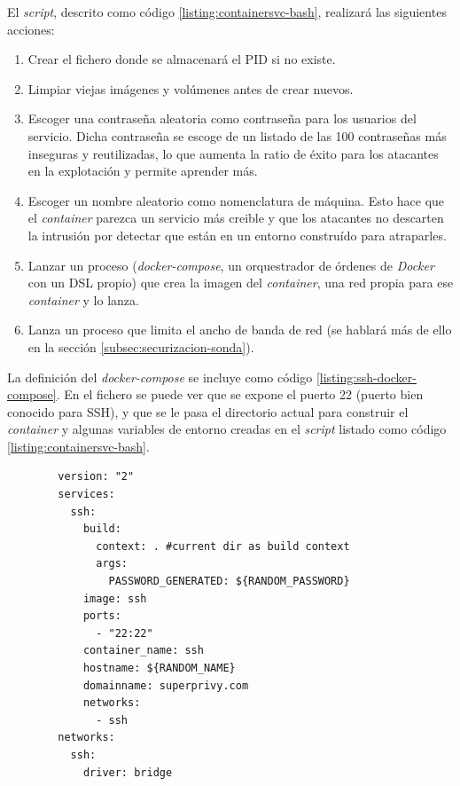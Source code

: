 
    
El \emph{script}, descrito como código \ref{listing:containersvc-bash}, realizará las siguientes acciones:

\begin{enumerate}
    \item Crear el fichero donde se almacenará el PID si no existe.
    \item Limpiar viejas imágenes y volúmenes antes de crear nuevos.
    \item Escoger una contraseña aleatoria como contraseña para los usuarios del servicio. Dicha
    contraseña se escoge de un listado de las 100 contraseñas más inseguras y reutilizadas, lo que aumenta
    la ratio de éxito para los atacantes en la explotación y permite aprender más.
    \item Escoger un nombre aleatorio como nomenclatura de máquina. Esto hace que el \emph{container} parezca un servicio
    más creible y que los atacantes no descarten la intrusión por detectar que están en un entorno construído para atraparles.
    \item Lanzar un proceso (\emph{docker-compose}, un orquestrador de órdenes de \emph{Docker} con un DSL propio) que crea la imagen del \emph{container}, una red propia para ese \emph{container} y lo lanza. 
    \item Lanza un proceso que limita el ancho de banda de red (se hablará más de ello en la sección \ref{subsec:securizacion-sonda}).
\end{enumerate}

La definición del \emph{docker-compose} se incluye como código \ref{listing:ssh-docker-compose}. En el fichero se puede ver que se expone el puerto
22 (puerto bien conocido para SSH), y que se le pasa el directorio actual para construir el \emph{container} y algunas variables de entorno 
creadas en el \emph{script} listado como código \ref{listing:containersvc-bash}.

    \begin{verbatim}
        version: "2"
        services:
          ssh:
            build:
              context: . #current dir as build context
              args:
                PASSWORD_GENERATED: ${RANDOM_PASSWORD}
            image: ssh
            ports:
              - "22:22"
            container_name: ssh
            hostname: ${RANDOM_NAME}
            domainname: superprivy.com
            networks:
              - ssh
        networks:
          ssh:
            driver: bridge
    \end{verbatim}

